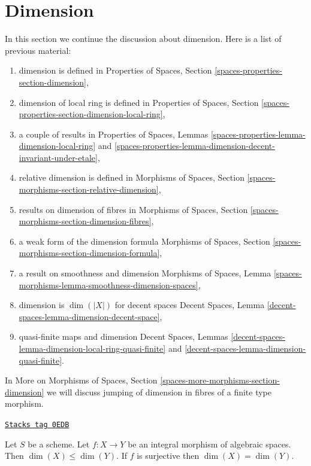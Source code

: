 \section{Dimension}
\label{spaces-over-fields-section-dimension}
In this section we continue the discussion about dimension.
Here is a list of previous material:
\begin{enumerate}
\item dimension is defined in
Properties of Spaces, Section
\ref{spaces-properties-section-dimension},
\item dimension of local ring is defined in
Properties of Spaces, Section
\ref{spaces-properties-section-dimension-local-ring},
\item a couple of results in Properties of Spaces, Lemmas
\ref{spaces-properties-lemma-dimension-local-ring} and
\ref{spaces-properties-lemma-dimension-decent-invariant-under-etale},
\item relative dimension is defined in
Morphisms of Spaces, Section \ref{spaces-morphisms-section-relative-dimension},
\item results on dimension of fibres in
Morphisms of Spaces, Section \ref{spaces-morphisms-section-dimension-fibres},
\item a weak form of the dimension formula
Morphisms of Spaces, Section \ref{spaces-morphisms-section-dimension-formula},
\item a result on smoothness and dimension Morphisms of Spaces, Lemma
\ref{spaces-morphisms-lemma-smoothness-dimension-spaces},
\item dimension is $\dim(|X|)$ for decent spaces
Decent Spaces, Lemma \ref{decent-spaces-lemma-dimension-decent-space},
\item quasi-finite maps and dimension
Decent Spaces, Lemmas
\ref{decent-spaces-lemma-dimension-local-ring-quasi-finite} and
\ref{decent-spaces-lemma-dimension-quasi-finite}.
\end{enumerate}
In More on Morphisms of Spaces, Section
\ref{spaces-more-morphisms-section-dimension}
we will discuss jumping of
dimension in fibres of a finite type morphism.

\begin{lemma}
\label{spaces-over-fields-lemma-integral-dimension}
\href{https://stacks.math.columbia.edu/tag/0EDB}{\texttt{Stacks tag 0EDB}}

Let $S$ be a scheme. Let $f : X \to Y$ be an integral morphism
of algebraic spaces. Then $\dim(X) \leq \dim(Y)$.
If $f$ is surjective then $\dim(X) = \dim(Y)$.
\end{lemma}

